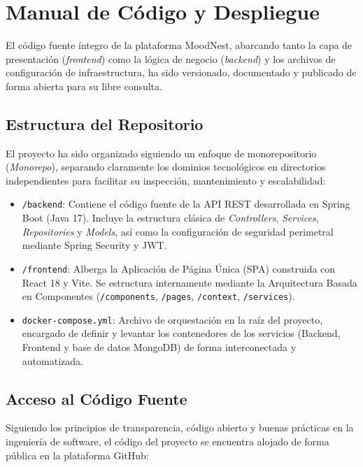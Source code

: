 \newpage
\section{Manual de Código y Despliegue}
\label{sec:manual_codigo}

El código fuente íntegro de la plataforma MoodNest, abarcando tanto la capa de presentación (\textit{frontend}) como la lógica de negocio (\textit{backend}) y los archivos de configuración de infraestructura, ha sido versionado, documentado y publicado de forma abierta para su libre consulta.

\subsection{Estructura del Repositorio}

El proyecto ha sido organizado siguiendo un enfoque de monorepositorio (\textit{Monorepo}), separando claramente los dominios tecnológicos en directorios independientes para facilitar su inspección, mantenimiento y escalabilidad:

\begin{itemize}
    \item \texttt{/backend}: Contiene el código fuente de la API REST desarrollada en Spring Boot (Java 17). Incluye la estructura clásica de \textit{Controllers}, \textit{Services}, \textit{Repositories} y \textit{Models}, así como la configuración de seguridad perimetral mediante Spring Security y JWT.
    \item \texttt{/frontend}: Alberga la Aplicación de Página Única (SPA) construida con React 18 y Vite. Se estructura internamente mediante la Arquitectura Basada en Componentes (\texttt{/components}, \texttt{/pages}, \texttt{/context}, \texttt{/services}).
    \item \texttt{docker-compose.yml}: Archivo de orquestación en la raíz del proyecto, encargado de definir y levantar los contenedores de los servicios (Backend, Frontend y base de datos MongoDB) de forma interconectada y automatizada.
\end{itemize}

\subsection{Acceso al Código Fuente}

Siguiendo los principios de transparencia, código abierto y buenas prácticas en la ingeniería de software, el código del proyecto se encuentra alojado de forma pública en la plataforma GitHub:

